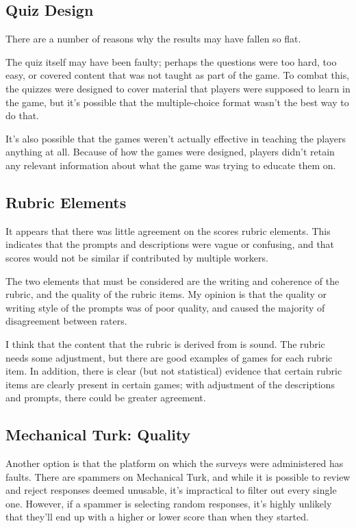 \documentclass[12pt]{report}
\begin{document}
		\subsection{Quiz Design}

			There are a number of reasons why the results may have fallen so flat.

			The quiz itself may have been faulty; perhaps the questions were too hard, too easy, or covered content that was not taught as part of the game. To combat this, the quizzes were designed to cover material that players were supposed to learn in the game, but it's possible that the multiple-choice format wasn't the best way to do that.

			It's also possible that the games weren't actually effective in teaching the players anything at all. Because of how the games were designed, players didn't retain any relevant information about what the game was trying to educate them on.

		\subsection{Rubric Elements}

			It appears that there was little agreement on the scores rubric elements. This indicates that the prompts and descriptions were vague or confusing, and that scores would not be similar if contributed by multiple workers.

			The two elements that must be considered are the writing and coherence of the rubric, and the quality of the rubric items. My opinion is that the quality or writing style of the prompts was of poor quality, and caused the majority of disagreement between raters.

			I think that the content that the rubric is derived from is sound. The rubric needs some adjustment, but there are good examples of games for each rubric item. In addition, there is clear (but not statistical) evidence that certain rubric items are clearly present in certain games; with adjustment of the descriptions and prompts, there could be greater agreement.  

		\subsection{Mechanical Turk: Quality}

			Another option is that the platform on which the surveys were administered has faults. There are spammers on Mechanical Turk, and while it is possible to review and reject responses deemed unusable, it's impractical to filter out every single one. However, if a spammer is selecting random responses, it's highly unlikely that they'll end up with a higher or lower score than when they started. 
\end{document}
